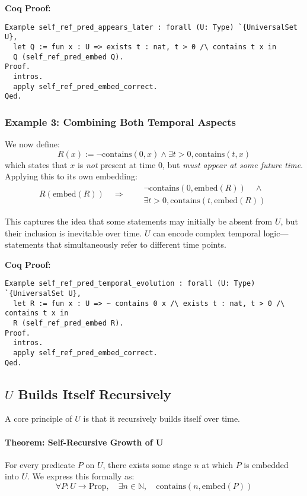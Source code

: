 \documentclass[12pt]{article}
\begin{document}
\textbf{Coq Proof:}
\begin{lstlisting}[language=Coq]
Example self_ref_pred_appears_later : forall (U: Type) `{UniversalSet U},
  let Q := fun x : U => exists t : nat, t > 0 /\ contains t x in
  Q (self_ref_pred_embed Q).
Proof.
  intros.
  apply self_ref_pred_embed_correct.
Qed.
\end{lstlisting}


\subsubsection{Example 3: Combining Both Temporal Aspects}

We now define:
\[
R(x) := \neg \text{contains}(0, x) \wedge \exists t > 0, \text{contains}(t, x)
\]
which states that \( x \) is \textit{not} present at time \( 0 \), but \textit{must appear at some future time}. Applying this to its own embedding:
\[
R(\text{embed}(R)) \quad \Rightarrow \quad
\begin{aligned}
    & \neg \text{contains}(0, \text{embed}(R)) \quad \wedge \\
    & \exists t > 0, \text{contains}(t, \text{embed}(R))
\end{aligned}
\]

This captures the idea that some statements may initially be absent from \( U \), but their inclusion is inevitable over time. \( U \) can encode complex temporal logic—statements that simultaneously refer to different time points.

\textbf{Coq Proof:}
\begin{lstlisting}[language=Coq]
Example self_ref_pred_temporal_evolution : forall (U: Type) `{UniversalSet U},
  let R := fun x : U => ~ contains 0 x /\ exists t : nat, t > 0 /\ contains t x in
  R (self_ref_pred_embed R).
Proof.
  intros.
  apply self_ref_pred_embed_correct.
Qed.
\end{lstlisting}


\subsection{\( U \) Builds Itself Recursively}

A core principle of \( U \) is that it recursively builds itself over time.

\paragraph{Theorem: Self-Recursive Growth of U}
For every predicate \( P \) on \( U \), there exists some stage \( n \) at which \( P \) is embedded into \( U \). We express this formally as:
\[
\forall P: U \to \text{Prop}, \quad \exists n \in \mathbb{N}, \quad \text{contains}(n, \text{embed}(P))
\]
\end{document}
